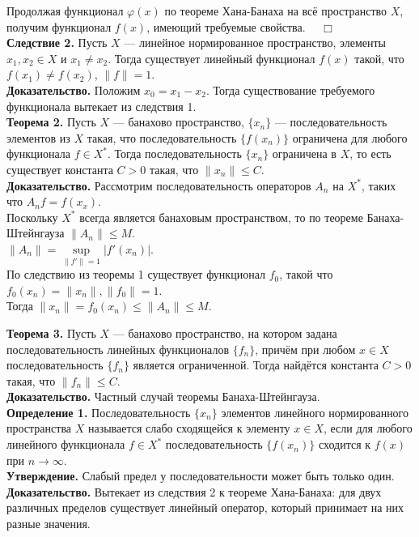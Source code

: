 \documentclass[12pt,a4paper, titlepage]{article}
\begin{document}
Продолжая функционал $\varphi(x)$ по теореме Хана-Банаха на всё пространство $X$, получим функционал $f(x)$, имеющий требуемые свойства. $\quad \Box$\\

\textbf{Следствие 2.} Пусть $X$ --- линейное нормированное пространство, элементы $x_1, x_2 \in X$ и $x_1 \neq x_2$. Тогда существует линейный функционал $f(x)$ такой, что $f(x_1) \neq f(x_2)$, $\|f\| = 1$.\\
\textbf{Доказательство.} Положим $x_0 = x_1 - x_2$. Тогда существование требуемого функционала вытекает из следствия 1.\\

\textbf{Теорема 2.}
Пусть $X$ --- банахово пространство, $\lbrace x_n\rbrace$ --- последовательность элементов из $X$ такая, что последовательность $\lbrace f(x_n)\rbrace$ ограничена для любого функционала $f \in X^*$. Тогда последовательность $\lbrace x_n\rbrace$ ограничена в $X$, то есть существует константа $C > 0$ такая, что $\|x_n\| \leqslant C$.\\
\textbf{Доказательство.} Рассмотрим последовательность операторов $A_n$ на $X^*$, таких что $A_nf = f(x_x)$.\\
Поскольку $X^*$ всегда является банаховым пространством, то по теореме Банаха-Штейнгауза $\|A_n\| \leqslant M$. \\
$\|A_n\| = \sup\limits_{\|f'\| = 1}|f'(x_n)|$. \\
По следствию из теоремы 1 существует функционал $f_0$, такой что $f_0(x_n) = \|x_n\|, \|f_0\| = 1$. \\
Тогда $\|x_n\| = f_0(x_n) \leqslant \|A_n\| \leqslant M$.

\textbf{Теорема 3.} Пусть $X$ --- банахово пространство, на котором задана последовательность линейных функционалов $\lbrace f_n \rbrace$, причём при любом $x \in X$ последовательность $\lbrace f_n \rbrace$ является ограниченной. Тогда найдётся константа $C > 0$ такая, что $\|f_n\| \leqslant C$. \\
\textbf{Доказательство.} Частный случай теоремы Банаха-Штейнгауза.\\

\textbf{Определение 1.} Последовательность $\lbrace x_n \rbrace$ элементов линейного нормированного пространства $X$ называется слабо сходящейся к элементу $x \in X$, если для любого линейного функционала $f \in X^*$ последовательность $\lbrace f(x_n) \rbrace$ сходится к $f(x)$ при $n\to\infty$.\\

\textbf{Утверждение.} Слабый предел у последовательности может быть только один. \\
\textbf{Доказательство.} Вытекает из следствия 2 к теореме Хана-Банаха: для двух различных пределов существует линейный оператор, который принимает на них разные значения. \\
\end{document}
